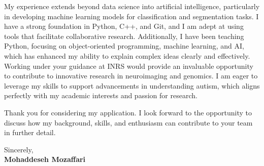 \documentclass[letterpaper,11pt]{letter}
\begin{document}
My experience extends beyond data science into artificial intelligence, particularly in developing machine learning models for classification and segmentation tasks. I have a strong foundation in Python, C++, and Git, and I am adept at using tools that facilitate collaborative research. Additionally, I have been teaching Python, focusing on object-oriented programming, machine learning, and AI, which has enhanced my ability to explain complex ideas clearly and effectively. Working under your guidance at INRS would provide an invaluable opportunity to contribute to innovative research in neuroimaging and genomics. I am eager to leverage my skills to support advancements in understanding autism, which aligns perfectly with my academic interests and passion for research.

Thank you for considering my application. I look forward to the opportunity to discuss how my background, skills, and enthusiasm can contribute to your team in further detail.

\begin{flushleft}
    Sincerely, \\
    \textbf{Mohaddeseh Mozaffari}
\end{flushleft}
\end{document}

